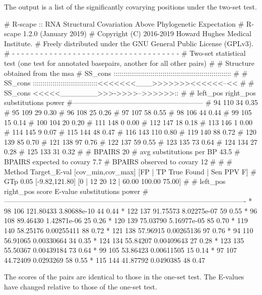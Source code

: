 \noindent
The output is a list of the significantly covarying positions under the two-set test.

\begin{sreoutput}
# R-scape :: RNA Structural Covariation Above Phylogenetic Expectation
# R-scape 1.2.0 (January 2019)
# Copyright (C) 2016-2019 Howard Hughes Medical Institute.
# Freely distributed under the GNU General Public License (GPLv3).
# - - - - - - - - - - - - - - - - - - - - - - - - - - - - - - - - - - - -
# Two-set statistical test (one test for annotated basepairs, another for all other pairs)
#
# Structure obtained from the msa
# SS_cons ::::::::::::::::::::::::::::::::::::::::::::::::::::::::::::
#
# SS_cons :::::::::::::::::::::::::::::::::<<<<<<<___>>>>>>><<<<<<--<<
#
# SS_cons <<<<<_______>>>->>>>-->>>>>>::
#
# left_pos      right_pos    substitutions      power
#--------------------------------------------------------
# 94		110		34		0.35
# 95		109		29		0.30
# 96		108		25		0.26
# 97		107		58		0.55
# 98		106		44		0.44
# 99		105		15		0.14
# 100		104		20		0.20
# 111		148		0		0.00
# 112		147		18		0.18
# 113		146		1		0.00
# 114		145		9		0.07
# 115		144		48		0.47
# 116		143		110		0.80
# 119		140		88		0.72
# 120		139		85		0.70
# 121		138		97		0.76
# 122		137		59		0.55
# 123		135		73		0.64
# 124		134		27		0.28
# 125		133		31		0.32
#
# BPAIRS 20
# avg substitutions per BP  43.5
# BPAIRS expected to covary 7.7
# BPAIRS observed to covary 12
#
#
# Method Target_E-val [cov_min,cov_max] [FP | TP True Found | Sen PPV F] 
# GTp    0.05         [-9.82,121.80]     [0 | 12 20 12 | 60.00 100.00 75.00] 
#
#       left_pos       right_pos        score          E-value       substitutions      power
#-------------------------------------------------------------------------------------------------------
*	      98	     106	121.80433	3.80688e-10	44		0.44
*	     122	     137	91.75573	8.02275e-07	59		0.55
*	      96	     108	89.46430	1.42871e-06	25		0.26
*	     120	     139	75.03790	5.16977e-05	85		0.70
*	     119	     140	58.25176	0.00255411	88		0.72
*	     121	     138	57.96915	0.00265136	97		0.76
*	      94	     110	56.91065	0.00330664	34		0.35
*	     124	     134	55.84207	0.00409643	27		0.28
*	     123	     135	55.50367	0.00439184	73		0.64
*	      99	     105	53.86423	0.00611505	15		0.14
*	      97	     107	44.72409	0.0293269	58		0.55
*	     115	     144	41.87792	0.0490385	48		0.47
\end{sreoutput}
The scores of the pairs are identical to those in the one-set
test. The E-values have changed relative to those of the one-set test.


